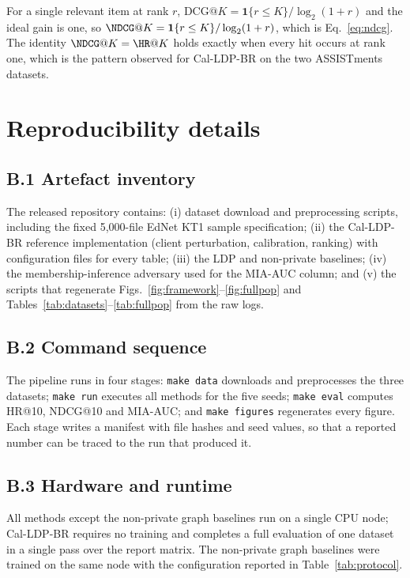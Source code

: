 \documentclass[pdflatex,sn-basic,Numbered]{sn-jnl}
\theoremstyle{plain}
\theoremstyle{remark}
\theoremstyle{definition}
\begin{document}
For a single relevant item at rank $r$, $\mathrm{DCG}@K=\mathbf 1\{r\le K\}/\log_2(1+r)$ and the ideal gain is one, so $\NDCG@K=\mathbf 1\{r\le K\}/\log_2(1+r)$, which is Eq.~\eqref{eq:ndcg}. The identity $\NDCG@K=\HR@K$ holds exactly when every hit occurs at rank one, which is the pattern observed for Cal-LDP-BR on the two ASSISTments datasets.

\section{Reproducibility details}\label{app:repro}

\subsection*{B.1 Artefact inventory}

The released repository contains: (i) dataset download and preprocessing scripts, including the fixed 5{,}000-file EdNet KT1 sample specification; (ii) the Cal-LDP-BR reference implementation (client perturbation, calibration, ranking) with configuration files for every table; (iii) the LDP and non-private baselines; (iv) the membership-inference adversary used for the MIA-AUC column; and (v) the scripts that regenerate Figs.~\ref{fig:framework}--\ref{fig:fullpop} and Tables~\ref{tab:datasets}--\ref{tab:fullpop} from the raw logs.

\subsection*{B.2 Command sequence}

The pipeline runs in four stages: \texttt{make data} downloads and preprocesses the three datasets; \texttt{make run} executes all methods for the five seeds; \texttt{make eval} computes HR@10, NDCG@10 and MIA-AUC; and \texttt{make figures} regenerates every figure. Each stage writes a manifest with file hashes and seed values, so that a reported number can be traced to the run that produced it.

\subsection*{B.3 Hardware and runtime}

All methods except the non-private graph baselines run on a single CPU node; Cal-LDP-BR requires no training and completes a full evaluation of one dataset in a single pass over the report matrix. The non-private graph baselines were trained on the same node with the configuration reported in Table~\ref{tab:protocol}.



\end{document}

